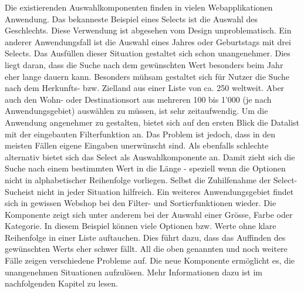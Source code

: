 Die existierenden Auswahlkomponenten finden in vielen Webapplikationen Anwendung.
Das bekanneste Beispiel eines Selects ist die Auswahl des Geschlechts.
Diese Verwendung ist abgesehen vom Design unproblematisch.
Ein anderer Anwendungsfall ist die Auswahl eines Jahres oder Geburtstags mit drei Selects.
Das Ausfüllen dieser Situation gestaltet sich schon unangenehmer.
Dies liegt daran, dass die Suche nach dem gewünschten Wert besonders beim Jahr eher lange dauern kann.
Besonders mühsam gestaltet sich für Nutzer die Suche nach dem Herkunfts- bzw. Zielland aus einer Liste von ca. 250 weltweit.
Aber auch den Wohn- oder Destinationsort aus mehreren 100 bis 1'000 (je nach Anwendungsgebiet) auswählen zu müssen, ist sehr zeitaufwendig.
Um die Anwendung angenehmer zu gestalten, bietet sich auf den ersten Blick die Datalist mit der eingebauten Filterfunktion an.
Das Problem ist jedoch, dass in den meisten Fällen eigene Eingaben unerwünscht sind.
Als ebenfalls schlechte alternativ bietet sich das Select als Auswahlkomponente an.
Damit zieht sich die Suche nach einem bestimmten Wert in die Länge - speziell wenn die Optionen nicht in alphabetischer Reihenfolge vorliegen.
Selbst die Zuhilfenahme der Select-Suche\footnotemark ist nicht in jeder Situation hilfreich. 
Ein weiteres Anwendungsgebiet findet sich in gewissen Webshop bei den Filter- und Sortierfunktionen wieder.
Die Komponente zeigt sich unter anderem bei der Auswahl einer Grösse, Farbe oder Kategorie.
In diesem Beispiel können viele Optionen bzw. Werte ohne klare Reihenfolge in einer Liste auftauchen.
Dies führt dazu, dass das Auffinden des gewünschten Werts eher schwer fällt.
All die oben genannten und noch weitere Fälle zeigen verschiedene Probleme auf.
Die neue Komponente ermöglicht es, die unangenehmen Situationen aufzulösen.
Mehr Informationen dazu ist im nachfolgenden Kapitel zu lesen.
